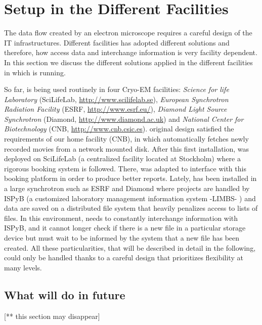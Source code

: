 \section{\scipion Setup in the Different Facilities}

The data flow created by an electron microscope requires a careful design of the IT infrastructures.  Different facilities has adopted different solutions and therefore, 
how \scipion  access data and interchange information is very facility dependent. In this section we discuss  the different solutions applied in the different facilities in which \scipion is running.

So far, \scipion is being used routinely in four Cryo-EM facilities: \emph{Science for life Laboratory} (SciLifeLab, \url{http://www.scilifelab.se}),  \emph{European Synchrotron Radiation Facility} (ESRF, \url{http://www.esrf.eu/}), \emph{Diamond Light Source Synchrotron} (Diamond, \url{http://www.diamond.ac.uk}) and \emph{National Center for Biotechnology} (CNB, \url{http://www.cnb.csic.es}). \scipion original design satisfied the requirements of our home facility (CNB), in which \scipion automatically fetches newly recorded movies from a network mounted disk. After this first installation, \scipion was deployed on SciLifeLab (a centralized facility located at Stockholm) where a rigorous booking system is followed. There, \scipion was adapted to interface with this booking platform in order to produce better reports. Lately,  \scipion has been installed in a large synchrotron  such as ESRF and Diamond  where projects are handled by ISPyB (a customized laboratory management information system -LIMBS- \citep{Delageniere2011}) and data are saved on a distributed file system that heavily penalizes access to lists of files. In this environment, \scipion needs to constantly interchange information with ISPyB, and it cannot longer check if there is a new file in a particular storage device but must wait to be informed by the system that a new file has been created. All these particularities, that will be described in detail in the following, could only be handled thanks to a careful design that prioritizes flexibility at many levels. 










\subsection{What will do in future}
[** this section may disappear] 


